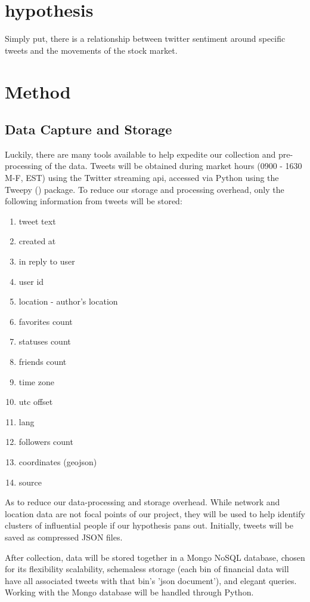 \documentclass[titlepage]{article}\usepackage[]{graphicx}\usepackage[]{color}
\begin{document}
\section{hypothesis}

Simply put, there is a relationship between twitter sentiment around specific
tweets and the movements of the stock market. 

\section{Method}
\label{sec:method}

\subsection{Data Capture and Storage}

Luckily, there are many tools available to help expedite our collection and pre-processing 
of the data. Tweets will be obtained during market hours (0900 - 1630 M-F, EST) 
using the Twitter streaming api, accessed via Python using the Tweepy
(\cite{tweepy}) package. To reduce our storage and processing overhead, only the following information from tweets will be stored:

\begin{enumerate}
\item tweet text
\item created at
\item in reply to user
\item user id
\item location - author’s location
\item favorites count
\item statuses count
\item friends count
\item time zone
\item utc offset
\item lang
\item followers count
\item coordinates (geojson)
\item source
\end{enumerate}


As to reduce our data-processing and storage overhead. While network and
location data are not focal points of our project, they will be used to help
identify clusters of influential people if our hypothesis pans out. Initially,
tweets will be saved as compressed JSON files. 


After collection, data will be stored together in a Mongo NoSQL database, chosen for its
flexibility scalability, schemaless storage (each bin of financial data will
have all associated tweets with that bin’s 'json document'), and elegant
queries. Working with the Mongo database will be handled through Python. 
\end{document}
